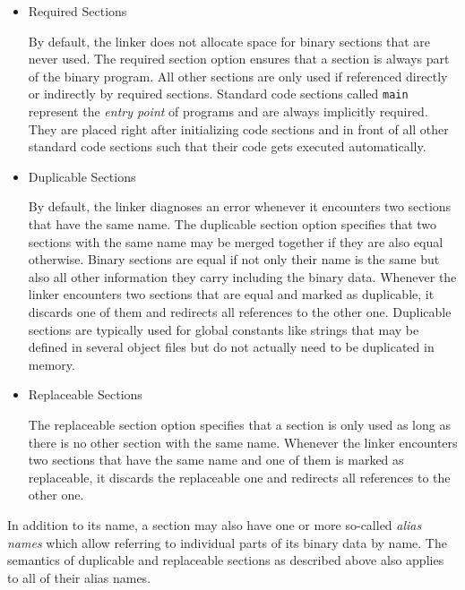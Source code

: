 \begin{itemize}

\item Required Sections\alignright{}\nopagebreak

By default, the linker does not allocate space for binary sections that are never used.
The required section option ensures that a section is always part of the binary program.
All other sections are only used if referenced directly or indirectly by required sections.
Standard code sections called \texttt{main} represent the \emph{entry point} of programs and are always implicitly required.
They are placed right after initializing code sections and in front of all other standard code sections such that their code gets executed automatically.

\item Duplicable Sections\alignright{}\nopagebreak

By default, the linker diagnoses an error whenever it encounters two sections that have the same name.
The duplicable section option specifies that two sections with the same name may be merged together if they are also equal otherwise.
Binary sections are equal if not only their name is the same but also all other information they carry including the binary data.
Whenever the linker encounters two sections that are equal and marked as duplicable, it discards one of them and redirects all references to the other one.
Duplicable sections are typically used for global constants like strings that may be defined in several object files but do not actually need to be duplicated in memory.

\item Replaceable Sections\alignright{}\nopagebreak

The replaceable section option specifies that a section is only used as long as there is no other section with the same name.
Whenever the linker encounters two sections that have the same name and one of them is marked as replaceable, it discards the replaceable one and redirects all references to the other one.

\end{itemize}

In addition to its name, a section may also have one or more so-called \emph{alias names} which allow referring to individual parts of its binary data by name.
The semantics of duplicable and replaceable sections as described above also applies to all of their alias names.

